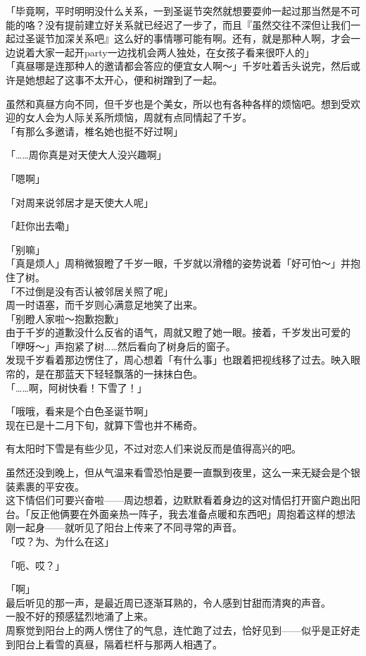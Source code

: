 「毕竟啊，平时明明没什么关系，一到圣诞节突然就想要耍帅一起过那当然是不可能的咯？没有提前建立好关系就已经迟了一步了，而且『虽然交往不深但让我们一起过圣诞节加深关系吧』这么好的事情哪可能有啊。还有，就是那种人啊，才会一边说着大家一起开party一边找机会两人独处，在女孩子看来很吓人的」\\

「真昼哪是连那种人的邀请都会答应的便宜女人啊～」千岁吐着舌头说完，然后或许是她想起了这事不太开心，便和树蹭到了一起。

虽然和真昼方向不同，但千岁也是个美女，所以也有各种各样的烦恼吧。想到受欢迎的女人会为人际关系所烦恼，周就有点同情起了千岁。\\

「有那么多邀请，椎名她也挺不好过啊」

「……周你真是对天使大人没兴趣啊」

「嗯啊」

「对周来说邻居才是天使大人呢」

「赶你出去嘞」

「别嘛」\\

「真是烦人」周稍微狠瞪了千岁一眼，千岁就以滑稽的姿势说着「好可怕～」并抱住了树。\\

「不过倒是没有否认被邻居关照了呢」\\

周一时语塞，而千岁则心满意足地笑了出来。\\

「别瞪人家啦～抱歉抱歉」\\

由于千岁的道歉没什么反省的语气，周就又瞪了她一眼。接着，千岁发出可爱的「咿呀～」声抱紧了树……然后看向了树身后的窗子。\\

发现千岁看着那边愣住了，周心想着「有什么事」也跟着把视线移了过去。映入眼帘的，是在那蓝天下轻轻飘落的一抹抹白色。\\

「……啊，阿树快看！下雪了！」

「哦哦，看来是个白色圣诞节啊」\\

现在已是十二月下旬，就算下雪也并不稀奇。

有太阳时下雪是有些少见，不过对恋人们来说反而是值得高兴的吧。

虽然还没到晚上，但从气温来看雪恐怕是要一直飘到夜里，这么一来无疑会是个银装素裹的平安夜。\\

这下情侣们可要兴奋啦——周边想着，边默默看着身边的这对情侣打开窗户跑出阳台。「反正他俩要在外面亲热一阵子，我去准备点暖和东西吧」周抱着这样的想法刚一起身——就听见了阳台上传来了不同寻常的声音。\\

「哎？为、为什么在这」

「呃、哎？」

「啊」\\

最后听见的那一声，是最近周已逐渐耳熟的，令人感到甘甜而清爽的声音。\\

一股不好的预感猛烈地涌了上来。\\

周察觉到阳台上的两人愣住了的气息，连忙跑了过去，恰好见到——似乎是正好走到阳台上看雪的真昼，隔着栏杆与那两人相遇了。
